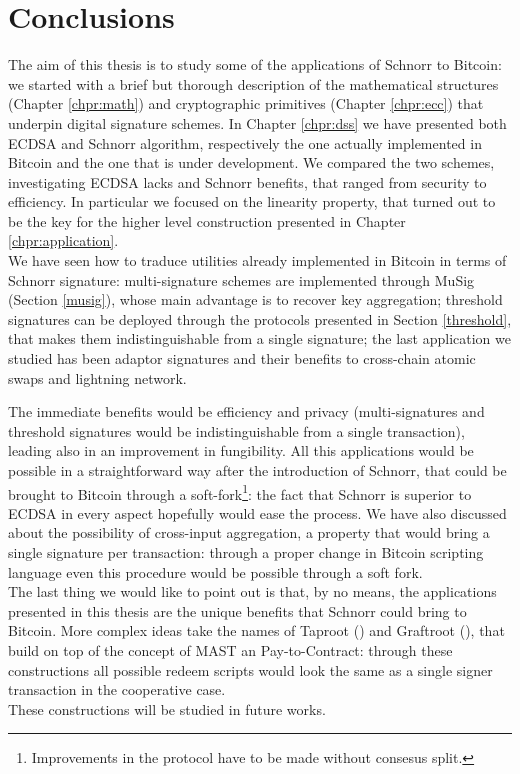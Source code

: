\chapter{Conclusions}
\label{chpr:conclusion}
The aim of this thesis is to study some of the applications of Schnorr to Bitcoin: we started with a brief but thorough description of the mathematical structures (Chapter \ref{chpr:math}) and cryptographic primitives (Chapter \ref{chpr:ecc}) that underpin digital signature schemes. In Chapter \ref{chpr:dss} we have presented both ECDSA and Schnorr algorithm, respectively the one actually implemented in Bitcoin and the one that is under development. We compared the two schemes, investigating ECDSA lacks and Schnorr benefits, that ranged from security to efficiency. In particular we focused on the linearity property, that turned out to be the key for the higher level construction presented in Chapter \ref{chpr:application}.
\\
We have seen how to traduce utilities already implemented in Bitcoin in terms of Schnorr signature: multi-signature schemes are implemented through MuSig (Section \ref{musig}), whose main advantage is to recover key aggregation; threshold signatures can be deployed through the protocols presented in Section \ref{threshold}, that makes them indistinguishable from a single signature; the last application we studied has been adaptor signatures and their benefits to cross-chain atomic swaps and lightning network.

\bigskip
\noindent
The immediate benefits would be efficiency and privacy (multi-signatures and threshold signatures would be indistinguishable from a single transaction), leading also in an improvement in fungibility. All this applications would be possible in a straightforward way after the introduction of Schnorr, that could be brought to Bitcoin through a soft-fork\footnote{Improvements in the protocol have to be made without consesus split.}: the fact that Schnorr is superior to ECDSA in every aspect hopefully would ease the process. We have also discussed about the possibility of cross-input aggregation, a property that would bring a single signature per transaction: through a proper change in Bitcoin scripting language even this procedure would be possible through a soft fork.
\\
The last thing we would like to point out is that, by no means, the applications presented in this thesis are the unique benefits that Schnorr could bring to Bitcoin. More complex ideas take the names of Taproot (\cite{Taproot}) and Graftroot (\cite{Graftroot}), that build on top of the concept of MAST an Pay-to-Contract: through these constructions all possible redeem scripts would look the same as a single signer transaction in the cooperative case.
\\
These constructions will be studied in future works.